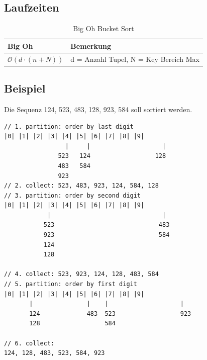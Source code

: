 \subsection{Laufzeiten}
\begin{table}[h]
	\centering
	\begin{tabu} to \linewidth {l l}
		\toprule
		Big Oh & Bemerkung \\
		\midrule
		$\mathcal{O}(d \cdot (n+N))$ & d = Anzahl Tupel, N = Key Bereich Max\\
		\bottomrule
	\end{tabu}
	\caption{Big Oh Bucket Sort}
\end{table}

\subsection{Beispiel}
Die Sequenz 124, 523, 483, 128, 923, 584 soll sortiert werden.
\begin{lstlisting}
// 1. partition: order by last digit
|0| |1| |2| |3| |4| |5| |6| |7| |8| |9|
				 |     |           	        |
			   523   124           		  128
			   483   584 
			   923
// 2. collect: 523, 483, 923, 124, 584, 128
// 3. partition: order by second digit
|0| |1| |2| |3| |4| |5| |6| |7| |8| |9|
		    |                               |
		   523                             483
		   923                             584
		   124
		   128
		
// 4. collect: 523, 923, 124, 128, 483, 584
// 5. partition: order by first digit
|0| |1| |2| |3| |4| |5| |6| |7| |8| |9|
	   |               |    |                    |
	   124             483  523                  923
	   128                  584

// 6. collect: 
124, 128, 483, 523, 584, 923
\end{lstlisting}

\clearpage

